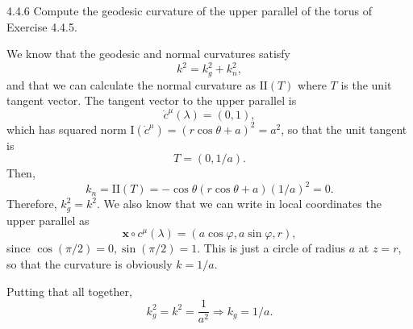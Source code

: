\documentclass[11pt]{article}
\begin{document}
\begin{problem}{4.4.6}
  Compute the geodesic curvature of the upper parallel of the torus of Exercise 4.4.5.
\end{problem}
\begin{answer}
  We know that the geodesic and normal curvatures satisfy
  \begin{equation}
  \label{eq:29}
  k^2 = k_g^2 + k_n^2,
\end{equation}
and that we can calculate the normal curvature as \( \mathrm{I \!I}(T) \) where \( T \) is the unit tangent vector.
The tangent vector to the upper parallel is
\begin{equation}
\label{eq:30}
\dot{c}^{\mu}(\lambda) = (0,1),
\end{equation}
which has squared norm \( \mathrm{I}(\dot{c}^{\mu}) = (r\cos\theta + a)^2 = a^2 \), so that the unit tangent is
\begin{equation}
\label{eq:31}
T = (0, 1/a).
\end{equation}
Then,
\begin{equation}
\label{eq:32}
k_n = \mathrm{I \!I}(T) = -\cos\theta(r\cos\theta + a)(1 / a)^2 = 0.
\end{equation}
Therefore, \( k_g^2 = k^2 \).
We also know that we can write in local coordinates the upper parallel as
\begin{equation}
\label{eq:33}
\mathbf{x} \circ c^{\mu}(\lambda) = (a\cos\varphi, a\sin\varphi, r),
\end{equation}
since \( \cos(\pi/2) = 0, \sin(\pi/2) = 1 \).
This is just a circle of radius \( a \) at \( z = r \), so that the curvature is obviously \( k = 1/a \).

Putting that all together,
\begin{equation}
\label{eq:34}
k_g^2 = k^2 = \frac{1}{a^2} \Rightarrow k_g = 1/a.
\end{equation}
\end{answer}
\end{document}
